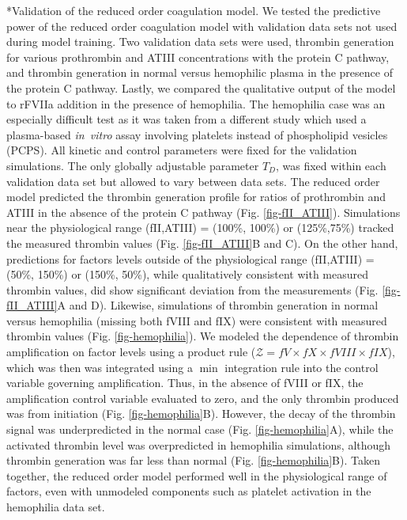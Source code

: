 \documentclass[12pt]{article}
\makeatletter
\renewcommand\subsection{\@startsection
	{subsection}{2}{0mm}
	{-0.05in}
	{-0.5\baselineskip}
	{\normalfont\normalsize\bfseries}}
\makeatother
\begin{document}
\subsection*{Validation of the reduced order coagulation model.}
We tested the predictive power of the reduced order coagulation model with validation data sets not used during model training. 
Two validation data sets were used, thrombin generation for various prothrombin and ATIII concentrations with the protein C pathway, 
and thrombin generation in normal versus hemophilic plasma in the presence of the protein C pathway. 
Lastly, we compared the qualitative output of the model to rFVIIa addition in the presence of hemophilia.
The hemophilia case was an especially difficult test as it was taken from a different study which used a plasma-based
\textit{in~vitro} assay involving platelets instead of phospholipid vesicles (PCPS). 
All kinetic and control parameters were fixed for the validation simulations. 
The only globally adjustable parameter $T_{D}$, was fixed within each validation data set but allowed to vary between data sets.
The reduced order model predicted the thrombin generation profile for ratios of prothrombin and ATIII in the absence of the protein C pathway (Fig. \ref{fig-fII_ATIII}).
Simulations near the physiological range (fII,ATIII) = (100\%, 100\%) or (125\%,75\%) tracked the measured thrombin values (Fig. \ref{fig-fII_ATIII}B and C).
On the other hand, predictions for factors levels outside of the physiological range (fII,ATIII) = (50\%, 150\%) or (150\%, 50\%), while qualitatively consistent with measured thrombin values, did show significant 
deviation from the measurements (Fig. \ref{fig-fII_ATIII}A and D).
Likewise, simulations of thrombin generation in normal versus hemophilia (missing both fVIII and fIX) were consistent with measured thrombin values (Fig. \ref{fig-hemophilia}).
We modeled the dependence of thrombin amplification on factor levels using a product rule ($\mathcal{Z} = fV\times fX\times fVIII\times fIX$), 
which was then was integrated using a $\min$ integration rule into the control variable governing amplification. 
Thus, in the absence of fVIII or fIX, the amplification control variable evaluated to zero, and the only thrombin produced was from initiation (Fig. \ref{fig-hemophilia}B).
However, the decay of the thrombin signal was underpredicted in the normal case (Fig. \ref{fig-hemophilia}A), while the activated thrombin level was overpredicted 
in hemophilia simulations, although thrombin generation was far less than normal (Fig. \ref{fig-hemophilia}B). 
Taken together, the reduced order model performed well in the physiological range of factors, even with
unmodeled components such as platelet activation in the hemophilia data set. 
\end{document}
